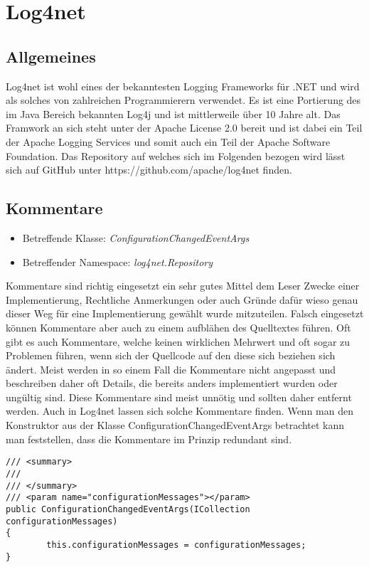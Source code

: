 \section{Log4net}
\subsection{Allgemeines}
Log4net ist wohl eines der bekanntesten Logging Frameworks für .NET und wird als solches von zahlreichen Programmierern verwendet. Es ist eine Portierung des im Java Bereich bekannten Log4j und ist mittlerweile über 10 Jahre alt. Das Framwork an sich steht unter der Apache License 2.0 bereit und ist dabei ein Teil der Apache Logging Services und somit auch ein Teil der Apache Software Foundation. Das Repository auf welches sich im Folgenden bezogen wird lässt sich auf GitHub unter https://github.com/apache/log4net finden.

\subsection{Kommentare}
\begin{itemize}
	\item Betreffende Klasse: \textit{ConfigurationChangedEventArgs}
	\item Betreffender Namespace: \textit{log4net.Repository}
\end{itemize}

Kommentare sind richtig eingesetzt ein sehr gutes Mittel dem Leser Zwecke einer Implementierung, Rechtliche Anmerkungen oder auch Gründe dafür wieso genau dieser Weg für eine Implementierung gewählt wurde mitzuteilen. Falsch eingesetzt können Kommentare aber auch zu einem aufblähen des Quelltextes führen. Oft gibt es auch Kommentare, welche keinen wirklichen Mehrwert und oft sogar zu Problemen führen, wenn sich der Quellcode auf den diese sich beziehen sich ändert. Meist werden in so einem Fall die Kommentare nicht angepasst und beschreiben daher oft Details, die bereits anders implementiert wurden oder ungültig sind. Diese Kommentare sind meist unnötig und sollten daher entfernt werden. Auch in Log4net lassen sich solche Kommentare finden. Wenn man den Konstruktor aus der Klasse ConfigurationChangedEventArgs betrachtet kann man feststellen, dass die Kommentare im Prinzip redundant sind.

\begin{lstlisting}[language={[Sharp]C}, caption=Beispiele für überflüssige Kommentare, label=lst:RedundantComment]
/// <summary>
/// 
/// </summary>
/// <param name="configurationMessages"></param>
public ConfigurationChangedEventArgs(ICollection configurationMessages)
{
		this.configurationMessages = configurationMessages;
}
\end{lstlisting}

